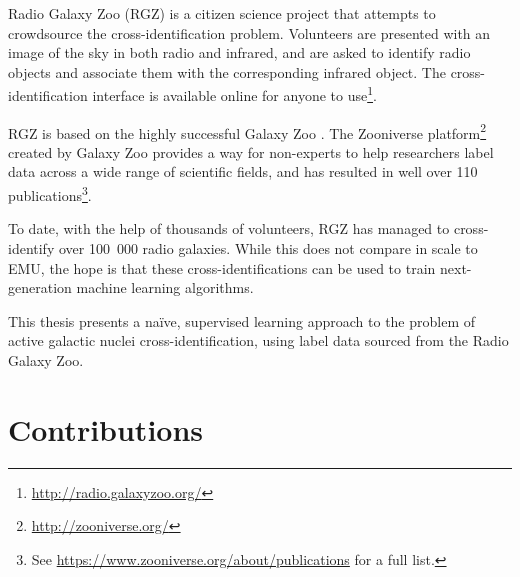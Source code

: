 

Radio Galaxy Zoo (RGZ) \citep{banfield15} is a citizen science project that
attempts to crowdsource the cross-identification problem. Volunteers are
presented with an image of the sky in both radio and infrared, and are asked to
identify radio objects and associate them with the corresponding infrared
object. The cross-identification interface is available online for anyone to
use\footnote{\url{http://radio.galaxyzoo.org/}}.

RGZ is based on the highly successful Galaxy Zoo \citep{lintott08, lintott11}.
The Zooniverse platform\footnote{\url{http://zooniverse.org/}} created by Galaxy
Zoo provides a way for non-experts to help researchers label data across a wide
range of scientific fields, and has resulted in well over 110
publications\footnote{See \url{https://www.zooniverse.org/about/publications}
for a full list.}.

To date, with the help of thousands of volunteers, RGZ has managed to
cross-identify over 100~000 radio galaxies. While this does not compare in scale
to EMU, the hope is that these cross-identifications can be used to train
next-generation machine learning algorithms.

This thesis presents a na\"ive, supervised learning approach to the problem of
active galactic nuclei cross-identification, using label data sourced from the
Radio Galaxy Zoo.

\section{Contributions}
\label{sec:contributions}

